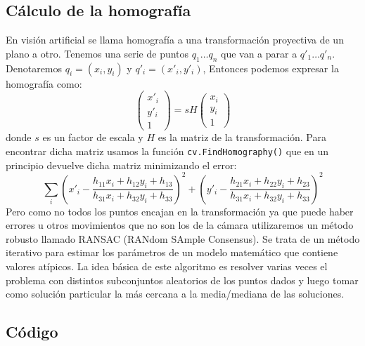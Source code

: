\documentclass[a4paper,openright, 12pt]{book}
\begin{document}
\subsection{Cálculo de la homografía}
En visión artificial se llama homografía a una transformación proyectiva de un plano a otro.
\newline
Tenemos una serie de puntos $q_1 \ldots q_n$ que van a parar a $q'_1 \ldots q'_n$. Denotaremos $q_i = (x_i,y_i)$ y $q'_i=(x'_i, y'_i)$,
Entonces podemos expresar la homografía como:
\begin{equation}
	\left( \begin{array}{c}
	x'_i\\
	y'_i\\
	1
	\end{array} \right)
	= sH
		\left( \begin{array}{c}
	x_i\\
	y_i\\
	1
	\end{array} \right)
\end{equation}
donde $s$ es un factor de escala y $H$ es la matriz de la transformación.
Para encontrar dicha matriz usamos la función \lstinline|cv.FindHomography()|
que en un principio devuelve dicha matriz minimizando el error:
\begin{equation*}
\sum_i \left( x'_i - \dfrac{h_{11}x_i + h_{12}y_i + h_{13}}{h_{31}x_i + h_{32}y_i + h_{33}} \right) ^2  
+ 
\left( y'_i - \dfrac{h_{21}x_i + h_{22}y_i + h_{23}}{h_{31}x_i + h_{32}y_i + h_{33}} \right) ^2 
\end{equation*}
Pero como no todos los puntos encajan en la transformación ya que puede haber errores u otros movimientos que no son los de la cámara utilizaremos un método robusto llamado RANSAC (RANdom SAmple Consensus). Se trata de un método iterativo para estimar los parámetros de un modelo matemático que contiene valores atípicos. La idea básica de este algoritmo es resolver varias veces el problema con distintos subconjuntos aleatorios de los puntos dados y luego tomar como solución particular la más cercana a la media/mediana de las soluciones.
\newpage
\subsection{Código}

\end{document}
